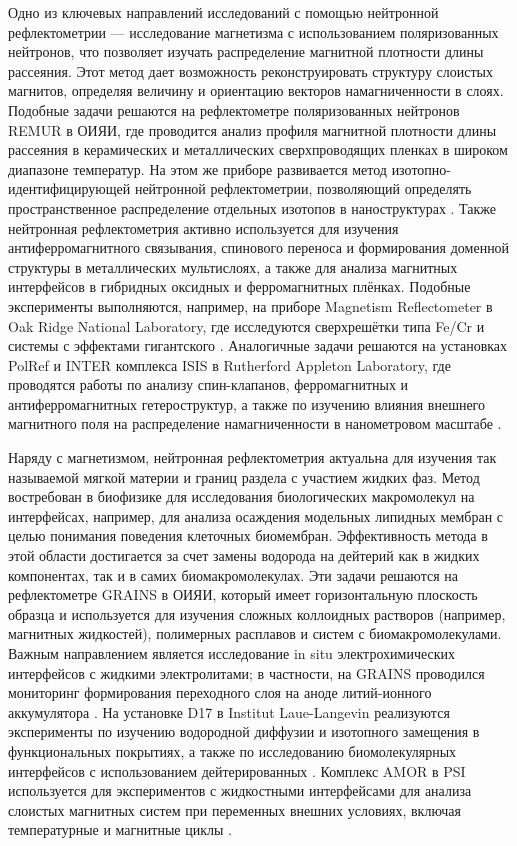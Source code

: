 \documentclass[a4paper]{article}
\begin{document}
Одно из ключевых направлений исследований с помощью нейтронной рефлектометрии  — исследование магнетизма с использованием поляризованных нейтронов, что позволяет изучать распределение магнитной плотности длины рассеяния. Этот метод дает возможность реконструировать структуру слоистых магнитов, определяя величину и ориентацию векторов намагниченности в слоях. Подобные задачи решаются на рефлектометре поляризованных нейтронов REMUR в ОИЯИ, где проводится анализ профиля магнитной плотности длины рассеяния в керамических и металлических сверхпроводящих пленках в широком диапазоне температур. На этом же приборе развивается метод изотопно-идентифицирующей нейтронной рефлектометрии, позволяющий определять пространственное распределение отдельных изотопов в наноструктурах  \cite{19}. Также нейтронная рефлектометрия активно используется для изучения антиферромагнитного связывания, спинового переноса и формирования доменной структуры в металлических мультислоях, а также для анализа магнитных интерфейсов в гибридных оксидных и ферромагнитных плёнках. Подобные эксперименты выполняются, например, на приборе Magnetism Reflectometer в Oak Ridge National Laboratory, где исследуются сверхрешётки типа Fe/Cr и системы с эффектами гигантского  \cite{22}. Аналогичные задачи решаются на установках PolRef и INTER комплекса ISIS в Rutherford Appleton Laboratory, где проводятся работы по анализу спин-клапанов, ферромагнитных и антиферромагнитных гетероструктур, а также по изучению влияния внешнего магнитного поля на распределение намагниченности в нанометровом масштабе \cite{21}.

Наряду с магнетизмом, нейтронная рефлектометрия актуальна для изучения так называемой мягкой материи и границ раздела с участием жидких фаз. Метод востребован в биофизике для исследования биологических макромолекул на интерфейсах, например, для анализа осаждения модельных липидных мембран с целью понимания поведения клеточных биомембран. Эффективность метода в этой области достигается за счет замены водорода на дейтерий как в жидких компонентах, так и в самих биомакромолекулах. Эти задачи решаются на рефлектометре GRAINS в ОИЯИ, который имеет горизонтальную плоскость образца и используется для изучения сложных коллоидных растворов (например, магнитных жидкостей), полимерных расплавов и систем с биомакромолекулами. Важным направлением является исследование in situ электрохимических интерфейсов с жидкими электролитами; в частности, на GRAINS проводился мониторинг формирования переходного слоя на аноде литий-ионного аккумулятора \cite{19}. На установке D17 в Institut Laue-Langevin реализуются эксперименты по изучению водородной диффузии и изотопного замещения в функциональных покрытиях, а также по исследованию биомолекулярных интерфейсов с использованием дейтерированных  \cite{20}. Комплекс AMOR в PSI используется для экспериментов с жидкостными интерфейсами для анализа слоистых магнитных систем при переменных внешних условиях, включая температурные и магнитные циклы \cite{23}. 
\end{document}
